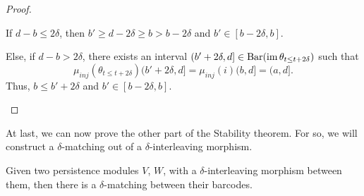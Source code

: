\begin{proof}
\begin{enumerate}
    If $ d-b \leq 2 \delta $, then $ b' \geq d - 2\delta \geq b > b -2 \delta $ and $ b' \in [b - 2 \delta, b] $.

    Else, if $ d-b > 2 \delta $, there exists an interval $ (b' + 2\delta, d] \in \operatorname{Bar}(\operatorname{im} \theta_{t \leq t+2\delta}) $ such that 
    $$
        \mu_{inj}(\theta_{t \leq t+2\delta})(b' + 2\delta, d] = \mu_{inj}(i)(b, d] = (a,d].
    $$
    Thus, $ b \leq b' + 2\delta $ and $ b' \in [b - 2 \delta, b] $.
\end{enumerate}
\end{proof}

At last, we can now prove the other part of the Stability theorem. For so, we will construct a $\delta$-matching out of a $\delta$-interleaving morphism.

\begin{proposition} \label{prop:matching-if-interleaving}
    Given two persistence modules $ V $, $ W $, with a $\delta$-interleaving morphism between them, then there is a $ \delta$-matching between their barcodes.
\end{proposition}
